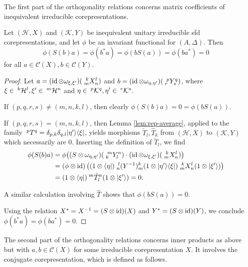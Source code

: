 The first part of the orthogonality relations concerns matrix
coefficients of inequivalent irreducible corepresentations.
\begin{Prop} \label{prop:rep-orthogonality-1}
  Let $(\mathcal{H},X)$ and $(\mathcal{K},Y)$ be inequivalent unitary
  irreducible sfd corepresentations, and let
  $\phi$ be an invariant functional for $(A,\Delta)$.  Then
  \[\phi(S(b)a) =\phi(b^{*}a) = \phi(bS(a))=\phi(ba^{*})=0\] for all
  $a\in \mathcal{C}(X), b \in \mathcal{C}(Y)$.
\end{Prop}
\begin{proof}
  Let $a=(\id \otimes \omega_{\xi,\xi'})(\Gr{X}{k}{l}{m}{n})$ and
  $b=(\id \otimes \omega_{\eta,\eta'})(\Gr{Y}{p}{q}{r}{s})$, where
  $\xi \in \Gru{\mathcal{H}}{k}{l}, \xi' \in \Gru{\mathcal{H}}{m}{n}$
  and $\eta \in \Gru{\mathcal{K}}{p}{q}, \eta' \in
  \Gru{\mathcal{K}}{r}{s}$. 
  
  If $(p,q,r,s) \neq (m,n,k,l)$, then clearly $\phi(S(b)a) = 0 = \phi(bS(a))$.
  
   If $(p,q,r,s) = (m,n,k,l)$,  then Lemma \ref{lem:rep-average}, applied to the 
  family $\Gru{T}{p}{q}= \delta_{p,k}\delta_{q,l}
  |\eta'\rangle\langle\xi|$, yields  morphisms $\check{T}_l,\hat{T}_k$
  from $(\mathcal{H},X)$ to $(\mathcal{K},Y)$ which necessarily are
  $0$. Inserting the definition of $\check{T}_l$, we find
  \begin{align*}
    \phi(S(b)a) &= \phi\big((S \otimes
    \omega_{\eta,\eta'})(\Gr{Y}{m}{n}{k}{l}) \cdot (\id \otimes
    \omega_{\xi,\xi'})(\Gr{X}{k}{l}{m}{n})\big) \\ &= (\phi \otimes
    \id)\left((1\otimes \langle\eta|) \Gr{(Y^{-1})}{l}{k}{n}{m}(1 \otimes
      |\eta'\rangle\langle \xi|)
      \Gr{X}{k}{l}{m}{n}(1\otimes |\xi'\rangle)\right) 
   \\ &= (1\otimes \langle \eta|) \Gru{\check{T}_l}{m}{n}(1\otimes |\xi'\rangle) = 0.
  \end{align*}%
  
  A similar calculation involving $\hat{T}$ shows that
  $\phi(bS(a))=0$.  
  
  Using the relation $X^{*}=X^{-1}=(S\otimes
  \id)(X)$ and $Y^{*}=(S\otimes \id)(Y)$, we conclude
  $\phi(b^{*}a)=\phi(ba^{*})=0$.
\end{proof}

The second part of the orthogonality relations concerns inner products
as above but with $a,b\in \mathcal{C}(X)$ for some irreducible
corepresentation  $X$. It involves the conjugate corepresentation,
which is defined as follows.

